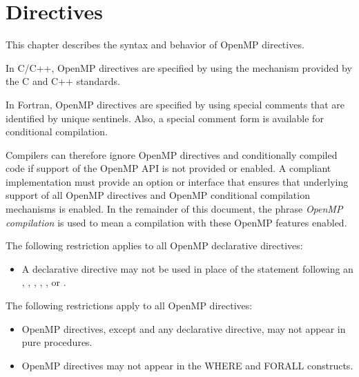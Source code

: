 \chapter{Directives}
\label{chap:Directives}
This chapter describes the syntax and behavior of OpenMP directives.

\begin{ccppspecific}
In C/C++, OpenMP directives are specified by using the  mechanism 
provided by the C and C++ standards.
\end{ccppspecific}

\begin{fortranspecific}
In Fortran, OpenMP directives are specified by using special comments that are
identified by unique sentinels. Also, a special comment form is available for 
conditional compilation.
\end{fortranspecific}

Compilers can therefore ignore OpenMP directives and conditionally compiled code if
support of the OpenMP API is not provided or enabled. A compliant implementation
must provide an option or interface that ensures that underlying support of all OpenMP
directives and OpenMP conditional compilation mechanisms is enabled. In the
remainder of this document, the phrase \emph{OpenMP compilation} is used to mean a
compilation with these OpenMP features enabled.

\restrictions

\begin{ccppspecific}
The following restriction applies to all OpenMP declarative directives:
\begin{itemize}
\item A declarative directive may not be used in place of the statement following
      an , , , , , or .
\end{itemize}
\end{ccppspecific}

\begin{fortranspecific}
The following restrictions apply to all OpenMP directives:
\begin{itemize}
  \item OpenMP directives, except  and any declarative directive,
 may not appear in pure procedures.
\item OpenMP directives may not appear in the WHERE and FORALL constructs.
\end{itemize}
\end{fortranspecific}


















